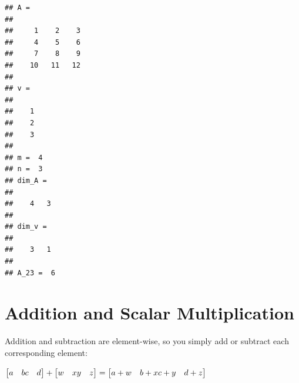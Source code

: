 \documentclass[
]{book}
\newenvironment{Shaded}{\begin{snugshade}}{\end{snugshade}}
\newcommand{\CommentTok}[1]{\textcolor[rgb]{0.56,0.35,0.01}{\textit{#1}}}
\newcommand{\FloatTok}[1]{\textcolor[rgb]{0.00,0.00,0.81}{#1}}
\newcommand{\FunctionTok}[1]{\textcolor[rgb]{0.00,0.00,0.00}{#1}}
\newcommand{\NormalTok}[1]{#1}
\newcommand{\OperatorTok}[1]{\textcolor[rgb]{0.81,0.36,0.00}{\textbf{#1}}}
\begin{document}
\begin{Shaded}
\end{Shaded}

\begin{verbatim}
## A =
## 
##     1    2    3
##     4    5    6
##     7    8    9
##    10   11   12
## 
## v =
## 
##    1
##    2
##    3
## 
## m =  4
## n =  3
## dim_A =
## 
##    4   3
## 
## dim_v =
## 
##    3   1
## 
## A_23 =  6
\end{verbatim}

\hypertarget{addition-and-scalar-multiplication}{%
\section{Addition and Scalar Multiplication}\label{addition-and-scalar-multiplication}}

Addition and subtraction are element-wise, so you simply add or subtract each corresponding element:

\(\begin{bmatrix} a & b \newline c & d \newline \end{bmatrix} +\begin{bmatrix} w & x \newline y & z \newline \end{bmatrix} =\begin{bmatrix} a+w & b+x \newline c+y & d+z \newline \end{bmatrix}\)
\end{document}
